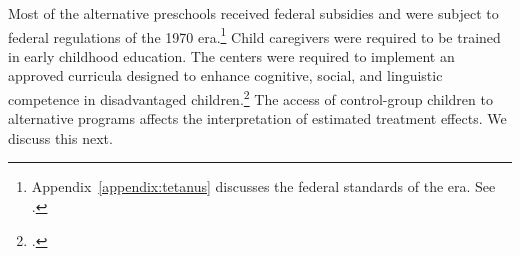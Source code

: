 Most of the alternative preschools received federal subsidies and were subject to federal regulations of the 1970 era.\footnote{Appendix~\ref{appendix:tetanus} discusses the federal standards of the era. See \citet{Department-of-Health_1968_DayCareRequirements,NCGA_1971_House-Bill-100,Ramey-et-al_1977_Intro-to-ABC,Ramey_Campbell_1979_SR,Ramey_McGinness_etal_1982_Abecedarianapproach, Burchinal_Campbell_etal_1997_CD}.} Child caregivers were required to be trained in early childhood education. The centers were required to implement an approved curricula designed to enhance cognitive, social, and linguistic competence in disadvantaged children.\footnote{\citet{Burchinal_etal_1989_CD_Daycare-Pre-K-Dev}.} The access of control-group children to alternative programs affects the interpretation of estimated treatment effects. We discuss this next.

